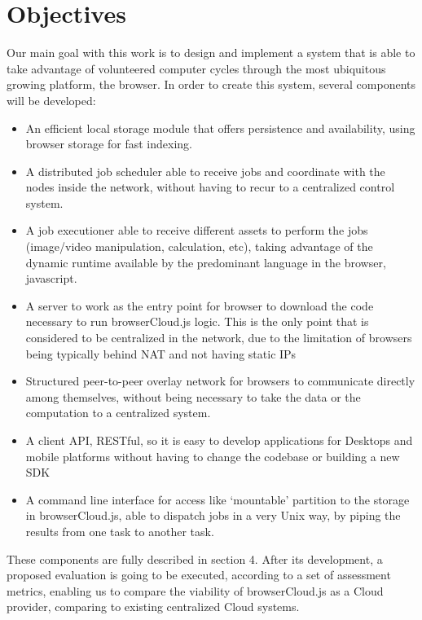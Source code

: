 
% 
% 

\section{Objectives}

Our main goal with this work is to design and implement a system that is able to take advantage of volunteered computer cycles through the most ubiquitous growing platform, the browser. In order to create this system, several components will be developed:

\begin{itemize}
  \item An efficient local storage module that offers persistence and availability, using browser storage for fast indexing.
  \item A distributed job scheduler able to receive jobs and coordinate with the nodes inside the network, without having to recur to a centralized control system.
  \item A job executioner able to receive different assets to perform the jobs (image/video manipulation, calculation, etc), taking advantage of the dynamic runtime available by the predominant language in the browser, javascript.
  \item A server to work as the entry point for browser to download the code necessary to run browserCloud.js logic. This is the only point that is considered to be centralized in the network, due to the limitation of browsers being typically behind NAT and not having static IPs
  \item Structured peer-to-peer overlay network for browsers to communicate directly among themselves, without being necessary to take the data or the computation to a centralized system.
  \item A client API, RESTful, so it is easy to develop applications for Desktops and mobile platforms without having to change the codebase or building a new SDK
  \item A command line interface for access like `mountable' partition to the storage in browserCloud.js, able to dispatch jobs in a very Unix way, by piping the results from one task to another task.
 
\end{itemize}

These components are fully described in section 4. After its development, a proposed evaluation is going to be executed, according to a set of assessment metrics, enabling us to compare the viability of browserCloud.js as a Cloud provider, comparing to existing centralized Cloud systems.
